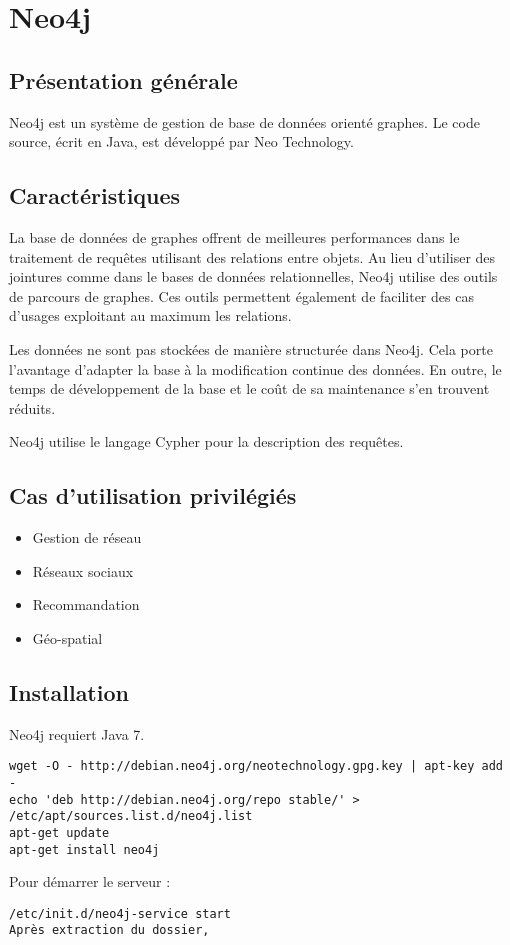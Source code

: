 \section{Neo4j}

\subsection{Présentation générale}

Neo4j est un système de gestion de base de données orienté graphes. Le code source, écrit en Java, est développé par Neo Technology.

\subsection{Caractéristiques}

La base de données de graphes offrent de meilleures performances dans le traitement de requêtes utilisant des relations entre objets. Au lieu d'utiliser des jointures comme dans le bases de données relationnelles, Neo4j utilise des outils de parcours de graphes. Ces outils permettent également de faciliter des cas d'usages exploitant au maximum les relations.

Les données ne sont pas stockées de manière structurée dans Neo4j. Cela porte l'avantage d'adapter la base à la modification continue des données. En outre, le temps de développement de la base et le coût de sa maintenance s'en trouvent réduits.

Neo4j utilise le langage Cypher pour la description des requêtes. 

\subsection{Cas d'utilisation privilégiés}

\begin{itemize}
      \item Gestion de réseau
      \item Réseaux sociaux
      \item Recommandation
      \item Géo-spatial
\end{itemize}

\subsection{Installation}

Neo4j requiert Java 7.

\begin{lstlisting}
wget -O - http://debian.neo4j.org/neotechnology.gpg.key | apt-key add -
echo 'deb http://debian.neo4j.org/repo stable/' > /etc/apt/sources.list.d/neo4j.list
apt-get update
apt-get install neo4j
\end{lstlisting}

Pour démarrer le serveur :
\begin{lstlisting}
/etc/init.d/neo4j-service start
Après extraction du dossier, 
\end{lstlisting}
